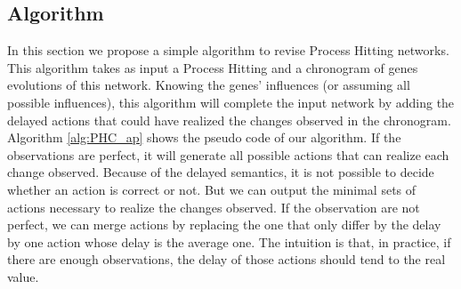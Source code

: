 \subsection{Algorithm}
In this section we propose a simple algorithm to revise Process Hitting networks.
This algorithm takes as input a Process Hitting and a chronogram of genes evolutions of this network.
Knowing the genes' influences (or assuming all possible influences),
this algorithm will complete the input network by adding the delayed actions that could have realized the changes observed in the chronogram.
Algorithm \ref{alg:PHC_ap} shows the pseudo code of our algorithm.
If the observations are perfect, it will generate all possible actions that can realize each change observed.
Because of the delayed semantics, it is not possible to decide whether an action is correct or not.
But we can output the minimal sets of actions necessary to realize the changes observed.
If the observation are not perfect, we can merge actions by replacing the one that only differ by the delay by one action whose delay is the average one.
The intuition is that, in practice, if there are enough observations, the delay of those actions should tend to the real value.

